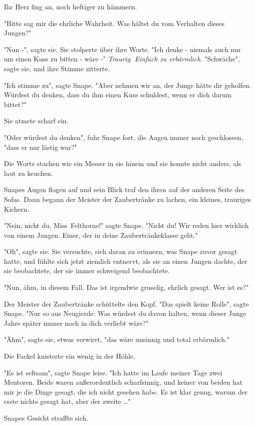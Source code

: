 {Ihr Herz fing an, noch heftiger zu hämmern.

"Bitte sag mir die ehrliche Wahrheit. Was hältst du vom Verhalten dieses Jungen?"

"Nun -", sagte sie. Sie stolperte über ihre Worte. "Ich denke - niemals auch nur um einen Kuss zu bitten - wäre -" \emph{Traurig. Einfach zu erbärmlich}. "Schwäche", sagte sie, und ihre Stimme zitterte.

"Ich stimme zu", sagte Snape. "Aber nehmen wir an, der Junge hätte dir geholfen. Würdest du denken, dass du ihm einen Kuss schuldest, wenn er dich darum bittet?"

Sie atmete scharf ein.

"Oder würdest du denken", fuhr Snape fort, die Augen immer noch geschlossen, "dass er nur lästig war?"

Die Worte stachen wie ein Messer in sie hinein und sie konnte nicht anders, als laut zu keuchen.

Snapes Augen flogen auf und sein Blick traf den ihren auf der anderen Seite des Sofas. Dann begann der Meister der Zaubertränke zu lachen, ein kleines, trauriges Kichern.

"Nein, nicht du, Miss~Felthorne!" sagte Snape. "Nicht du! Wir reden hier wirklich von einem Jungen. Einer, der in deine Zaubertränkeklasse geht."

"Oh", sagte sie. Sie versuchte, sich daran zu erinnern, was Snape zuvor gesagt hatte, und fühlte sich jetzt ziemlich entnervt, als sie an einen Jungen dachte, der sie beobachtete, der sie immer schweigend beobachtete.

"Nun, ähm, in diesem Fall. Das ist irgendwie gruselig, ehrlich gesagt. Wer ist es?"

Der Meister der Zaubertränke schüttelte den Kopf. "Das spielt keine Rolle", sagte Snape. "Nur so aus Neugierde: Was würdest du davon halten, wenn dieser Junge Jahre später immer noch in dich verliebt wäre?"

"Ähm", sagte sie, etwas verwirrt, "das wäre unsinnig und total erbärmlich."

Die Fackel knisterte ein wenig in der Höhle.

"Es ist seltsam", sagte Snape leise. "Ich hatte im Laufe meiner Tage zwei Mentoren. Beide waren außerordentlich scharfsinnig, und keiner von beiden hat mir je die Dinge gesagt, die ich nicht gesehen habe. Es ist klar genug, warum der erste nichts gesagt hat, aber der zweite …"

Snapes Gesicht straffte sich.

}
